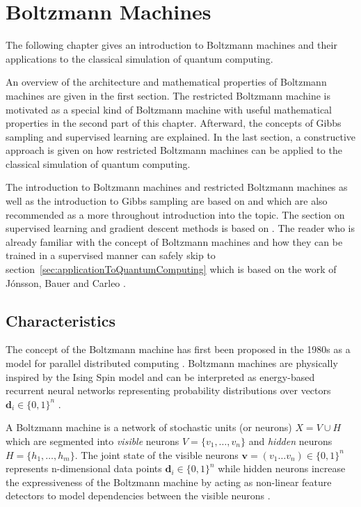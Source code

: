 \chapter{Boltzmann Machines}
The following chapter gives an introduction to Boltzmann machines and their applications to the classical 
simulation of quantum computing.

An overview of the architecture and mathematical properties of Boltzmann machines are given in the first section. The restricted Boltzmann machine is motivated as a special kind of Boltzmann machine with useful mathematical properties in the second part of this chapter. Afterward, the concepts of Gibbs sampling and supervised learning are explained.
In the last section, a constructive approach is given on how restricted Boltzmann machines 
can be applied to the classical simulation of quantum computing.

The introduction to Boltzmann machines and restricted Boltzmann machines as well as the introduction 
to Gibbs sampling are based on \cite{montufar2018restricted} and 
\cite{fischer2012introduction} which are also recommended as a more throughout introduction 
into the topic. The section on supervised learning and gradient descent methods is based on \cite{ruder2016overview}. The 
reader who is already familiar with the concept of Boltzmann machines and how they can be trained in a supervised 
manner can safely skip
to section~\ref{sec:applicationToQuantumComputing} which is based on the work of J\'{o}nsson, Bauer and Carleo \cite{jnsson2018neuralnetwork}.

\section{Characteristics}
The concept of the Boltzmann machine has first been proposed in the 1980s as a
model for parallel distributed computing \cite{hinton1983analyzing}. Boltzmann machines are physically inspired by the Ising Spin model and can be interpreted as energy-based recurrent neural networks representing probability distributions
over vectors $\bm{d}_i \in \{0,1\}^n$ \cite{ackley1985learning}.

A Boltzmann machine is a network of stochastic units (or neurons) $X=V \cup H$ which are segmented into
\textit{visible} neurons $V=\{v_1, \dots, v_n\}$ and \textit{hidden} neurons $H=\{h_1, \dots, h_m\}$.
The joint state of the visible neurons $\bm{v} = (v_1\dots v_n) \in \{0,1\}^n$ represents n-dimensional data
points $\bm{d}_i \in \{0,1\}^n$ while hidden neurons increase the expressiveness of the Boltzmann machine by acting as non-linear feature 
detectors to model dependencies between the visible neurons \cite{hinton2010boltzmann}.

